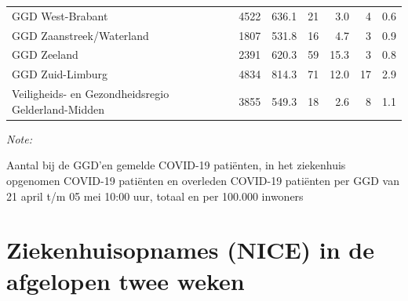\documentclass[
  english,
  man,floatsintext]{apa6}
\begin{document}
\begin{table}
\begin{threeparttable}
\begin{tabular}{lrrrrrr}
GGD West-Brabant & 4522 & 636.1 & 21 & 3.0 & 4 & 0.6\\
GGD Zaanstreek/Waterland & 1807 & 531.8 & 16 & 4.7 & 3 & 0.9\\
GGD Zeeland & 2391 & 620.3 & 59 & 15.3 & 3 & 0.8\\
GGD Zuid-Limburg & 4834 & 814.3 & 71 & 12.0 & 17 & 2.9\\
Veiligheids- en Gezondheidsregio Gelderland-Midden & 3855 & 549.3 & 18 & 2.6 & 8 & 1.1\\
\bottomrule
\end{tabular}
\begin{tablenotes}
\item \textit{Note: } 
\item Aantal bij de GGD’en gemelde COVID-19 patiënten, in het ziekenhuis opgenomen COVID-19 patiënten en overleden COVID-19 patiënten per GGD van 21 april t/m 05 mei 10:00 uur, totaal en per 100.000 inwoners
\end{tablenotes}
\end{threeparttable}
\endgroup{}
\end{table}

\newpage

\hypertarget{ziekenhuisopnames-nice-in-de-afgelopen-twee-weken}{%
\section{Ziekenhuisopnames (NICE) in de afgelopen twee weken}\label{ziekenhuisopnames-nice-in-de-afgelopen-twee-weken}}
\end{document}
